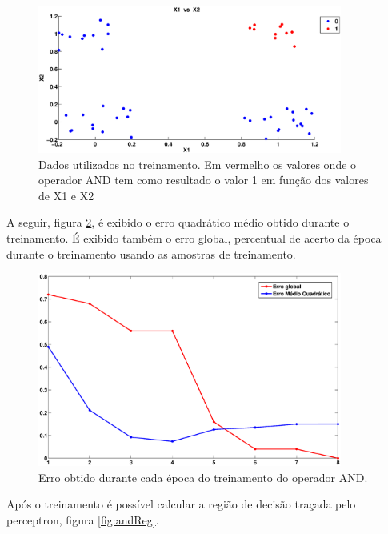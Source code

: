 \documentclass[12pt,journal,onecolumn]{IEEEtran}
\begin{document}
\begin{figure}[!htbp]
	\centering
	\includegraphics[width=10cm, trim = 3cm 1cm 3cm 1cm, clip=true
	]{eps/and/ANDDesired.eps}
	\caption{Dados utilizados no treinamento. Em vermelho os valores onde o
	operador AND tem como resultado o valor 1 em função dos valores de X1 e X2}
	\label{fig:AND_dados}
\end{figure} 

A seguir, figura \ref{fig:AND_err}, é exibido o erro quadrático médio obtido
durante o treinamento.
É exibido também o erro global, percentual de acerto da época durante o
treinamento usando as amostras de treinamento.

\begin{figure}[!htbp]
	\centering
	\includegraphics[width=10cm, trim = 3cm 1cm 3cm 1cm, clip=true
	]{eps/and/andErr.eps}
	\caption{Erro obtido durante cada época do treinamento do operador AND.}
	\label{fig:AND_err}
\end{figure} 

Após o treinamento é possível calcular a região de decisão traçada pelo
perceptron, figura \ref{fig:andReg}.
\end{document}
